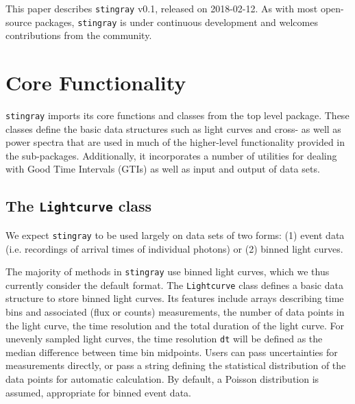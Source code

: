\documentclass[twocolumn]{aastex62}
\newcommand{\stingray}{\texttt{stingray}\xspace}
\newcommand{\lightcurve}{\texttt{Lightcurve}\xspace}
\begin{document}
This paper describes \stingray v0.1, released on 2018-02-12. 
As with most open-source packages, \stingray is under continuous development and welcomes contributions from the community.


\section{Core Functionality}
\label{sec:core}

\stingray imports its core functions and classes from the top level package. 
These classes define the basic data structures such as light curves and cross- as well as power spectra that are used in much of the higher-level functionality provided in the sub-packages. 
Additionally, it incorporates a number of utilities for dealing with Good Time Intervals (GTIs) as well as input and output of data sets. 
\subsection{The \texttt{Lightcurve} class}
\label{sec:lightcurve}


We expect \stingray to be used largely on data sets of two forms: (1) event data (i.e. recordings of arrival times of individual photons) or (2) binned light curves. 

The majority of methods in \stingray use binned light curves, which we thus currently consider the default format. The \lightcurve class defines a basic data structure to store binned light curves. Its features include arrays describing time bins and associated (flux or counts) measurements, the number of data points in the light curve, the time resolution and the total duration of the light curve. For unevenly sampled light curves, the time resolution \texttt{dt} will be defined as the median difference between time bin midpoints. Users can pass uncertainties for measurements directly, or pass a string defining the statistical distribution of the data points for automatic calculation. By default, a Poisson distribution is assumed, appropriate for binned event data. 
\end{document}
